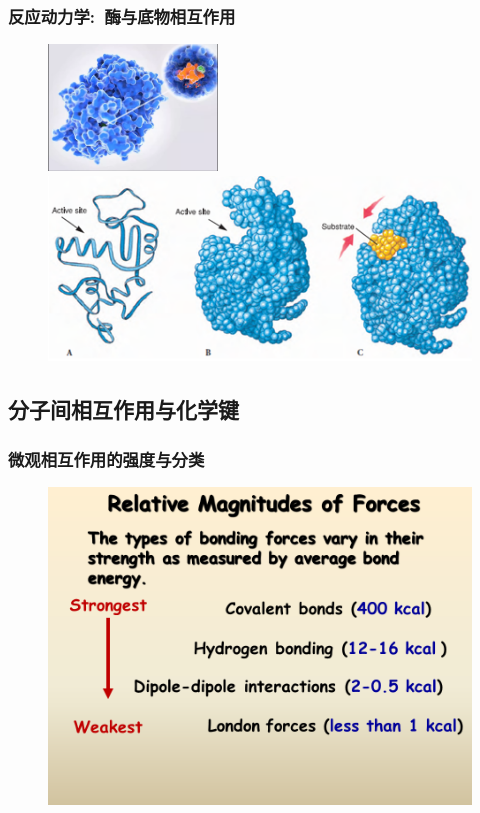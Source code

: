 \frame
{
	\frametitle{反应动力学:~酶与底物相互作用}
\begin{figure}[h!]
\centering
\vspace{-10.5pt}
\includegraphics[height=0.30\textwidth,width=0.4\textwidth,viewport=0 0 880 600,clip]{Figures/Active_site_model.png}
\includegraphics[height=0.37\textwidth,width=1.0\textwidth,viewport=0 0 460 200,clip]{Figures/enzyme-substrate-2.png}
\label{enzyme-substrate}
\end{figure}
}

\subsection{分子间相互作用与化学键}
\frame
{
	\frametitle{微观相互作用的强度与分类}
\begin{figure}[h!]
\centering
\vspace{-5.5pt}
\includegraphics[height=0.65\textwidth,width=1.05\textwidth,viewport=0 100 750 530,clip]{Figures/Bond-order.png}
\label{Bond-order}
\end{figure}
}

